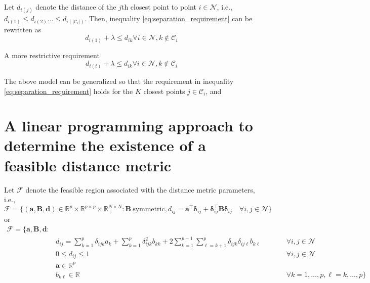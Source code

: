 \documentclass[]{article}
\renewcommand{\v}[1]{\ensuremath{\mathbf{#1}}}
\newcommand{\mc}{\mathcal}
\renewcommand{\Re}{\mathbb{R}} %
\newcommand{\vdelta}{\boldsymbol{\delta}}
\begin{document}
Let $d_{i(j)}$ denote the distance of the $j$th closest point to point $i \in \mc{N}$, i.e.,
$d_{i(1)} \leq d_{i(2)} \dots\leq d_{i(|\mc{C}_i|)}$. 
Then, inequality \eqref{eq:separation_requirement} can be rewritten as 
\begin{equation}
d_{i(1)} + \lambda \leq d_{ik} \forall i \in \mc{N}, k \notin \mc{C}_i
\end{equation}

A more restrictive requirement 
\begin{equation}
d_{i(t)} + \lambda \leq d_{ik} \forall i \in \mc{N}, k \notin \mc{C}_i
\end{equation}

The above model can be generalized so that the requirement in inequality \eqref{eq:separation_requirement} holds for the $K$ closest points $j \in \mc{C}_i$, and 






\newpage
\section{A linear programming approach to determine the existence of a feasible distance metric}

Let $\mc{F}$ denote the feasible region associated with the distance metric parameters, i.e.,
\begin{equation}
\mc{F} = \{ (\v{a},\v{B},\v{d}) \in \Re^p \times \Re^{p \times p} \times \Re_+^{N \times N} : \v{B}~\text{symmetric}, d_{ij} = \v{a}^{\top}\vdelta_{ij} + \vdelta_{ij}^{\top} \v{B}\vdelta_{ij} \quad \forall i,j \in \mc{N} \}
\end{equation}
or
\begin{subequations} \label{set:feasible_region_distance_metric}
\begin{alignat}{4}
\mc{F} = \Bigg\{ \v{a},\v{B},\v{d} : &  &&  \\
    & d_{ij} = \sum_{k=1}^p \delta_{ijk} a_{k} + \sum_{k=1}^p \delta_{ijk}^2 b_{kk} + 2 \sum_{k=1}^{p-1} \sum_{\ell=k+1}^p  \delta_{ijk} \delta_{ij\ell} b_{k\ell} && \qquad \forall i,j \in \mc{N} \label{eq:distance_metric_def} \\
    & 0 \leq d_{ij} \leq 1 && \qquad \forall i,j \in \mc{N} \\
    & \v{a} \in \Re^p && \\ 
    & b_{k\ell} \in \Re && \qquad \forall k=1,\dots,p, \ell=k,\dots,p \Bigg\}
\end{alignat}
\end{subequations}
\end{document}
